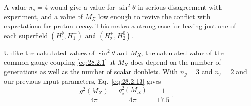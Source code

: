 A value \(n_s=4\) would give a value for \(\sin^2\theta\) in serious
disagreement with experiment, and a value of \(M_X\) low enough to revive
the conflict with expectations for proton decay. This makes a strong case
for having just one of each superfield \((H_1^0,H_1^-)\) and
\((H_2^+,H_2^0)\).

Unlike the calculated values of \(\sin^2\theta\) and \(M_X\), the calculated
value of the common gauge coupling \eqref{eq:28.2.1} at \(M_X\) does depend
on the number of generations as well as the number of scalar doublets. With
\(n_g=3\) and \(n_s=2\) and our previous input parameters,
Eq.~\eqref{eq:28.2.13} gives
\begin{equation}
  \frac{g^2(M_X)}{4\pi}
  =\frac{g_s^2(M_X)}{4\pi}
  =\frac{1}{17.5}\,.
  \tag{28.2.19}\label{eq:28.2.19}
\end{equation}
